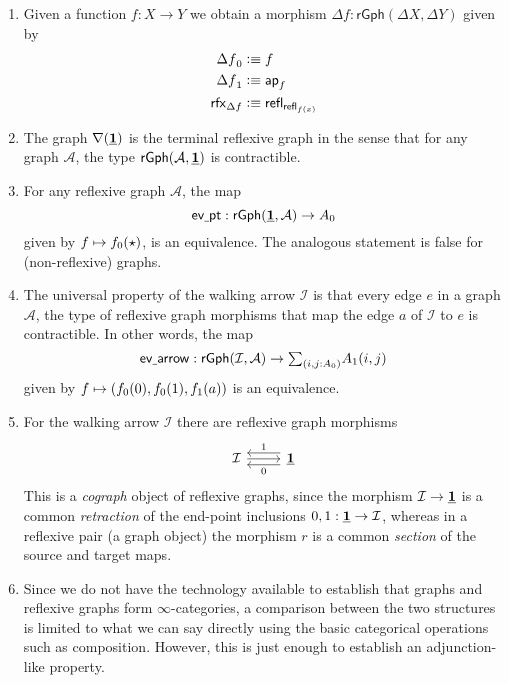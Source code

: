 \begin{eg}\label{eg:rgraph_morphism}
\begin{enumerate}
\item Given a function $f:X\to Y$ we obtain a morphism $\Delta f:\mathsf{rGph}(\Delta X,\Delta Y)$ given by
\begin{align*}
\pts{\Delta f} & \defeq f \\
\edg{\Delta f} & \defeq \apfunc{f} \\
\rfx{\Delta f} & \defeq \refl{\refl{f(x)}}
\end{align*}
\item The graph $\nabla(\underline{\mathbf{1}})$ is the terminal reflexive graph in the sense that for any graph $\mathcal{A}$, the type $\mathsf{rGph}(\mathcal{A},\underline{\mathbf{1}})$ is contractible.
\item For any reflexive graph $\mathcal{A}$, the map 
\begin{equation*}
\mathsf{ev\usc{}pt}:\mathsf{rGph}(\unit,\mathcal{A})\to\pts{A}
\end{equation*}
given by $f\mapsto \pts{f}(\ttt)$, is an equivalence. The analogous statement is false for (non-reflexive) graphs.
\item The universal property of the walking arrow $\mathcal{I}$ is that every edge $e$ in a graph $\mathcal{A}$, the type of reflexive graph morphisms that map the edge $a$ of $\mathcal{I}$ to $e$ is contractible. In other words, the map
\begin{equation*}
\mathsf{ev\usc{}arrow} : \mathsf{rGph}(\mathcal{I},\mathcal{A})\to \sm{i,j:\pts{A}}\edg{A}(i,j)
\end{equation*}
given by $f\mapsto (\pts{f}(0),\pts{f}(1),\edg{f}(a))$ is an equivalence.
\item For the walking arrow $\mathcal{I}$ there are reflexive graph morphisms
\begin{equation*}
\begin{tikzcd}
\mathcal{I} \arrow[r] & \unit \arrow[l,yshift=1ex,swap,"1"] \arrow[l,yshift=-1ex,"0"]
\end{tikzcd}
\end{equation*}
This is a \emph{cograph} object of reflexive graphs, since the morphism $\mathcal{I}\to\underline{\mathbf{1}}$ is a common \emph{retraction} of the end-point inclusions $0,1:\underline{\mathbf{1}}\to \mathcal{I}$, whereas in a reflexive pair (a graph object) the morphism $r$ is a common \emph{section} of the source and target maps.
\item \label{eg:freerfx} Since we do not have the technology available to establish that graphs and reflexive graphs form $\infty$-categories, a comparison between the two structures is limited to what we can say directly using the basic categorical operations such as composition. However, this is just enough to establish an adjunction-like property. 


\end{enumerate}
\end{eg}
